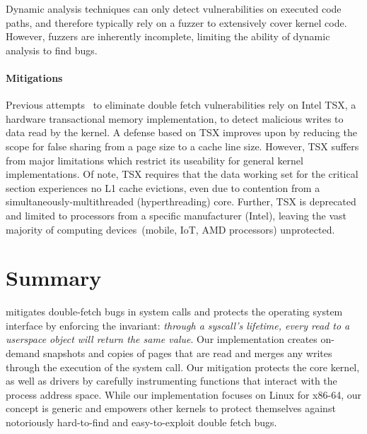 Dynamic analysis techniques can only detect vulnerabilities on executed code
paths, and therefore typically rely on a fuzzer to extensively cover kernel code.
However, fuzzers are inherently incomplete, limiting the ability of dynamic
analysis to find bugs.


\paragraph{Mitigations}
%
Previous attempts~\cite{schwartzDECAF,dftinker} to eliminate double fetch
vulnerabilities rely on Intel TSX, a hardware transactional
memory implementation, to detect malicious writes to data read by the
kernel.
A defense based on TSX improves upon \midas by reducing the scope for
false sharing from a page size to a cache line size.
However, TSX suffers from major limitations which restrict its useability
for general kernel implementations.
Of note, TSX requires that the data working set for the critical section
experiences no L1 cache evictions, even due to contention from a
simultaneously-multithreaded (hyperthreading) core.
Further, TSX is deprecated and limited to processors from a specific 
manufacturer (Intel), leaving the vast majority
of computing devices~(mobile, IoT, AMD processors) unprotected.

\section{\midas Summary}

\midas mitigates double-fetch bugs in system calls and protects the operating
system interface by enforcing the invariant:  \emph{through a syscall's
lifetime, every read to a userspace object will return the same value}.
Our \midas implementation creates on-demand snapshots and copies of pages that
are read and merges any writes through the execution of the system call.
%
Our mitigation protects the core kernel, as well as drivers by carefully
instrumenting functions that interact with the process address space. While our
implementation focuses on Linux for x86-64, our concept is generic and empowers
other kernels to protect themselves against notoriously hard-to-find and
easy-to-exploit double fetch bugs.


